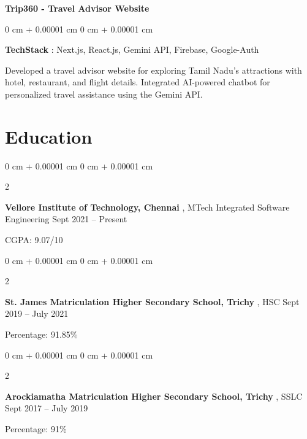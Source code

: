 \documentclass[10pt, letterpaper]{article}
\newenvironment{onecolentry}{
    \begin{adjustwidth}{
        0 cm + 0.00001 cm
    }{
        0 cm + 0.00001 cm
    }
}{
    \end{adjustwidth}
} %
\newenvironment{twocolentry}[2][]{
    \onecolentry
    \def\secondColumn{#2}
    \setcolumnwidth{\fill, 4.5 cm}
    \begin{paracol}{2}
}{
    \switchcolumn \raggedleft \secondColumn
    \end{paracol}
    \endonecolentry
} %
\begin{document}
         \vspace{0.3 cm}
         \begin{samepage}
                \textbf{Trip360 - Travel Advisor Website      }
            \vspace{0.05 cm}
            
            \begin{onecolentry}
               \textbf{TechStack} : Next.js, React.js, Gemini API, Firebase, Google-Auth  
               
                \vspace{0.05 cm}
               Developed a travel advisor website for exploring Tamil Nadu’s attractions with hotel, restaurant, and flight details. Integrated AI-powered chatbot for personalized travel assistance using the Gemini API.  
        \end{onecolentry}
        \end{samepage}
         \vspace{0.3 cm}
    \section{Education}
        
        \begin{twocolentry}{
            Sept 2021 – Present
        }
            \textbf{Vellore Institute of Technology, Chennai }, MTech Integrated Software Engineering \end{twocolentry}

        \vspace{0.10 cm}
       CGPA: 9.07/10
\vspace{0.10 cm}
\begin{twocolentry}{
            Sept 2019 – July 2021
        }
            \textbf{St. James Matriculation Higher Secondary School, Trichy  }, HSC\end{twocolentry}

        \vspace{0.10 cm}
       Percentage: 91.85\%
       \vspace{0.10 cm}
\begin{twocolentry}{
            Sept 2017 – July 2019
        }
            \textbf{Arockiamatha Matriculation Higher Secondary School, Trichy  }, SSLC\end{twocolentry}

        \vspace{0.10 cm}
       Percentage: 91\%
\end{document}

